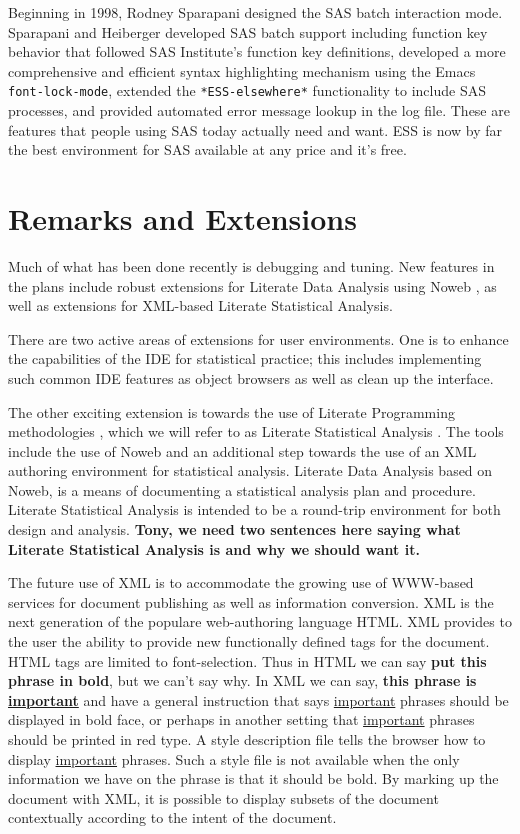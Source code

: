 \documentclass{article}
\newcommand{\stexttt}[1]{{\small\texttt{#1}}}
\newcommand{\marpar}[1]{\marginpar{\raggedright#1}}
\begin{document}
Beginning in 1998, Rodney Sparapani designed the SAS batch interaction
mode.  Sparapani and Heiberger developed SAS batch support including
function key behavior that followed SAS Institute's function key
definitions,  developed a more comprehensive and efficient syntax
highlighting mechanism using the Emacs \stexttt{font-lock-mode},
extended the  \stexttt{*ESS-elsewhere*} functionality to include SAS processes,
and provided  automated error message lookup in the log file.
These are features that people using SAS today
actually need and want.  ESS is now by far the best environment for
SAS available at any price and it's free.

\section{Remarks and Extensions}
\label{sec:remarks}

Much of what has been done recently is debugging and tuning.  New
features in the plans include robust extensions for Literate Data
Analysis using Noweb \citep{NRamsey:1994}, as well as extensions for
XML-based Literate Statistical Analysis.

There are two active areas of extensions for user environments.  One
is to enhance the capabilities of the IDE for statistical practice;
this includes implementing such common IDE features as object browsers
as well as clean up the interface.

The other exciting extension is towards the use of Literate
Programming methodologies \citep{Knuth:1992,NRamsey:1994}, which we
will refer to as Literate Statistical Analysis \citep{ross:lunt:2001}.
The tools include the use of Noweb \citep{NRamsey:1994} and an
additional step towards the use of an XML authoring environment for
statistical analysis.  Literate Data Analysis based on Noweb, is a
means of documenting a statistical analysis plan and procedure.
Literate Statistical Analysis is intended to be a round-trip
environment for both design and analysis.
{\bf Tony, we need two sentences here saying what Literate Statistical Analysis
is and why we should want it.}\marpar{Tony}


The future use of XML is to accommodate the growing use of WWW-based
services for document publishing as well as information conversion.
XML is the next generation of the populare web-authoring language HTML.
XML provides to the user the ability to provide new functionally defined tags
for the document.  HTML tags are limited to font-selection.  Thus in HTML
we can say {\bf put this phrase in bold}, but we can't say why.  In XML
\marpar{Tony, check this for validity.}
we can say, {\bf this phrase is \underline{important}} and have a general
instruction that says \underline{important} phrases should be displayed in bold
face, or perhaps in another setting that \underline{important} phrases should
be printed in red type.  A style description file tells the browser how to
display \underline{important} phrases.  Such a style file is not available
when the only information we have on the phrase is that it should be bold.
By marking up the document with XML, it is possible to display subsets
of the document contextually according to the intent of the document.
\end{document}
